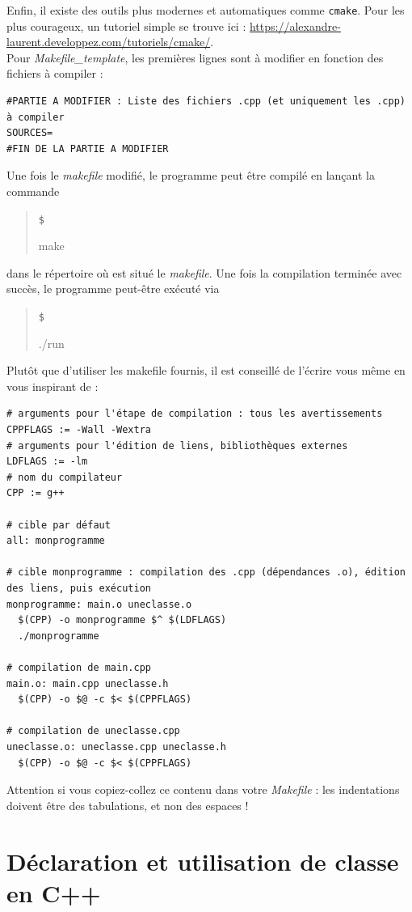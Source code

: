 \documentclass{book}
\newenvironment{prompt}{\begin{quote}\color{blue!75}\tt\$\,
}{\end{quote}}
\def\filename{\emph}
\begin{document}
Enfin, il existe des outils plus modernes et automatiques comme \texttt{cmake}. Pour les plus courageux, un tutoriel simple se trouve ici : \url{https://alexandre-laurent.developpez.com/tutoriels/cmake/}.\\

Pour \filename{Makefile\_template}, les premières lignes sont à modifier en fonction des fichiers à compiler :
\begin{verbatim}
#PARTIE A MODIFIER : Liste des fichiers .cpp (et uniquement les .cpp) à compiler
SOURCES=
#FIN DE LA PARTIE A MODIFIER
\end{verbatim}
Une fois le \filename{makefile} modifié, le programme peut être compilé en lançant la commande
\begin{prompt}
make
\end{prompt}
dans le répertoire où est situé le \filename{makefile}. Une fois la compilation terminée avec succès, le programme peut-être exécuté via
\begin{prompt}
./run
\end{prompt}

\par Plutôt que d'utiliser les makefile fournis, il est conseillé de l'écrire vous même en vous inspirant de :
\begin{verbatim}
# arguments pour l'étape de compilation : tous les avertissements
CPPFLAGS := -Wall -Wextra
# arguments pour l'édition de liens, bibliothèques externes
LDFLAGS := -lm 
# nom du compilateur
CPP := g++

# cible par défaut
all: monprogramme

# cible monprogramme : compilation des .cpp (dépendances .o), édition des liens, puis exécution
monprogramme: main.o uneclasse.o
  $(CPP) -o monprogramme $^ $(LDFLAGS)
  ./monprogramme

# compilation de main.cpp
main.o: main.cpp uneclasse.h
  $(CPP) -o $@ -c $< $(CPPFLAGS)

# compilation de uneclasse.cpp
uneclasse.o: uneclasse.cpp uneclasse.h
  $(CPP) -o $@ -c $< $(CPPFLAGS)
\end{verbatim}
Attention si vous copiez-collez ce contenu dans votre \filename{Makefile} : les indentations doivent être des tabulations, et non des espaces !


\section{Déclaration et utilisation de classe en C++}
\end{document}
